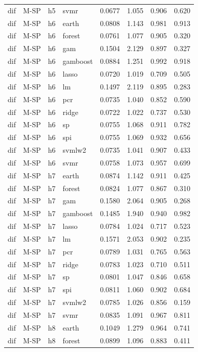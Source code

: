 \begin{ThreePartTable}
\begin{longtable}[t]{llclcccc}
dif & M-SP & h5 & svmr & 0.0677 & 1.055 & 0.906 & 0.620\\
\addlinespace
dif & M-SP & h6 & earth & 0.0808 & 1.143 & 0.981 & 0.913\\
dif & M-SP & h6 & forest & 0.0761 & 1.077 & 0.905 & 0.320\\
dif & M-SP & h6 & gam & 0.1504 & 2.129 & 0.897 & 0.327\\
dif & M-SP & h6 & gamboost & 0.0884 & 1.251 & 0.992 & 0.918\\
dif & M-SP & h6 & lasso & 0.0720 & 1.019 & 0.709 & 0.505\\
dif & M-SP & h6 & lm & 0.1497 & 2.119 & 0.895 & 0.283\\
dif & M-SP & h6 & pcr & 0.0735 & 1.040 & 0.852 & 0.590\\
dif & M-SP & h6 & ridge & 0.0722 & 1.022 & 0.737 & 0.530\\
dif & M-SP & h6 & sp & 0.0755 & 1.068 & 0.911 & 0.782\\
dif & M-SP & h6 & spi & 0.0755 & 1.069 & 0.932 & 0.656\\
dif & M-SP & h6 & svmlw2 & 0.0735 & 1.041 & 0.907 & 0.433\\
dif & M-SP & h6 & svmr & 0.0758 & 1.073 & 0.957 & 0.699\\
\addlinespace
dif & M-SP & h7 & earth & 0.0874 & 1.142 & 0.911 & 0.425\\
dif & M-SP & h7 & forest & 0.0824 & 1.077 & 0.867 & 0.310\\
dif & M-SP & h7 & gam & 0.1580 & 2.064 & 0.905 & 0.268\\
dif & M-SP & h7 & gamboost & 0.1485 & 1.940 & 0.940 & 0.982\\
dif & M-SP & h7 & lasso & 0.0784 & 1.024 & 0.717 & 0.523\\
dif & M-SP & h7 & lm & 0.1571 & 2.053 & 0.902 & 0.235\\
dif & M-SP & h7 & pcr & 0.0789 & 1.031 & 0.765 & 0.563\\
dif & M-SP & h7 & ridge & 0.0783 & 1.023 & 0.710 & 0.511\\
dif & M-SP & h7 & sp & 0.0801 & 1.047 & 0.846 & 0.658\\
dif & M-SP & h7 & spi & 0.0811 & 1.060 & 0.902 & 0.684\\
dif & M-SP & h7 & svmlw2 & 0.0785 & 1.026 & 0.856 & 0.159\\
dif & M-SP & h7 & svmr & 0.0835 & 1.091 & 0.967 & 0.811\\
\addlinespace
dif & M-SP & h8 & earth & 0.1049 & 1.279 & 0.964 & 0.741\\
dif & M-SP & h8 & forest & 0.0899 & 1.096 & 0.883 & 0.411\\

\end{longtable}
\end{ThreePartTable}
